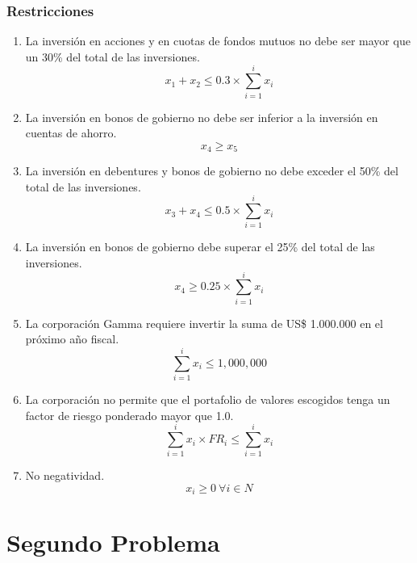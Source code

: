 \documentclass[a4paper,12pt]{article}
\begin{document}
\subsubsection{Restricciones}
\begin{enumerate}
	\item La inversión en acciones y en cuotas de fondos mutuos no debe ser mayor que un
	30\% del total de  las  inversiones.
	\begin{equation*}
		x_1 + x_2 \leq 0.3\times\sum_{i = 1}^{i}x_i
	\end{equation*}
	\item La  inversión  en  bonos  de  gobierno  no  debe  ser  inferior  a  la  inversión  en  cuentas  de  ahorro.
	\begin{equation*}
		x_4 \geq x_5
	\end{equation*}
	\item La inversión en debentures y bonos de gobierno no debe exceder el 50\% del total de las inversiones.
	\begin{equation*}
		x_3 + x_4 \leq 0.5\times\sum_{i = 1}^{i}x_i
	\end{equation*}
	\item La inversión en bonos de gobierno debe superar el 25\% del total de las inversiones.
	\begin{equation*}
		x_4 \geq 0.25\times\sum_{i = 1}^{i}x_i
	\end{equation*}
	\item La corporación Gamma    requiere invertir  la  suma  de  US\$  1.000.000  en el  próximo  año  fiscal.
	\begin{equation*}
		\sum_{i = 1}^{i}x_i \leq 1,000,000
	\end{equation*} 
	\item La corporación  no  permite  que el  portafolio  de  valores  escogidos  tenga  un  factor de  riesgo ponderado mayor que 1.0.
	\begin{equation*}
		\sum_{i = 1}^{i}x_i\times FR_i \leq \sum_{i = 1}^{i}x_i
	\end{equation*}
	\item No negatividad.
	\begin{equation*}
		x_i\geq 0\ \forall i \in N
	\end{equation*}
\end{enumerate}
\newpage
\section{Segundo Problema}
\end{document}
